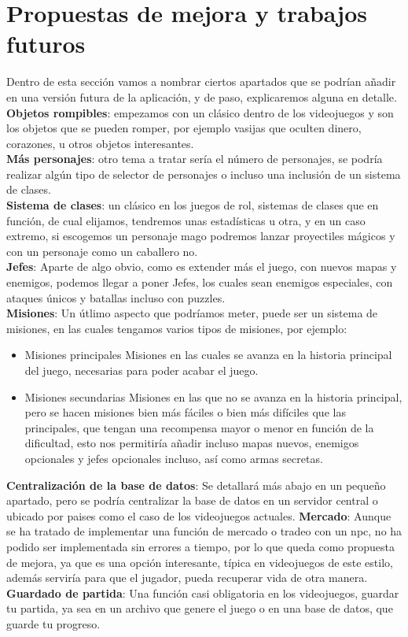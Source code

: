 \documentclass[a4paper]{article}
\begin{document}
\clearpage
\section{Propuestas de mejora y trabajos futuros}
Dentro de esta sección vamos a nombrar ciertos apartados que se podrían añadir en una versión futura de la aplicación, y de paso, explicaremos alguna en detalle.\\
\textbf{Objetos rompibles}: empezamos con un clásico dentro de los videojuegos y son los objetos que se pueden romper, por ejemplo vasijas que oculten dinero, corazones, u otros objetos interesantes.\\
\textbf{Más personajes}: otro tema a tratar sería el número de personajes, se podría realizar algún tipo de selector de personajes o incluso una inclusión de un sistema de clases.\\
\textbf{Sistema de clases}: un clásico en los juegos de rol, sistemas de clases que en función, de cual elijamos, tendremos unas estadísticas u otra, y en un caso extremo, si escogemos un personaje mago podremos lanzar proyectiles mágicos y con un personaje como un caballero no.\\
\textbf{Jefes}: Aparte de algo obvio, como es extender más el juego, con nuevos mapas y enemigos, podemos llegar a poner Jefes, los cuales sean enemigos especiales, con ataques únicos y batallas incluso con puzzles.\\
\textbf{Misiones}: Un útlimo aspecto que podríamos meter, puede ser un sistema de misiones, en las cuales tengamos varios tipos de misiones, por ejemplo:
\begin{itemize}
    \item Misiones principales
          Misiones en las cuales se avanza en la historia principal del juego, necesarias para poder acabar el juego.
    \item Misiones secundarias
          Misiones en las que no se avanza en la historia principal, pero se hacen misiones bien más fáciles o bien más difíciles que las principales, que tengan una recompensa mayor o menor en función de la dificultad, esto nos permitiría añadir incluso mapas nuevos, enemigos opcionales y jefes opcionales incluso, así como armas secretas.
\end{itemize}
\textbf{Centralización de la base de datos}: Se detallará más abajo en un pequeño apartado, pero se podría centralizar la base de datos en un servidor central o ubicado por paises como el caso de los videojuegos actuales.
\textbf{Mercado}: Aunque se ha tratado de implementar una función de mercado o tradeo con un npc, no ha podido ser implementada sin errores a tiempo, por lo que queda como propuesta de mejora, ya que es una opción interesante, típica en videojuegos de este estilo, además serviría para que el jugador, pueda recuperar vida de otra manera.
\textbf{Guardado de partida}: Una función casi obligatoria en los videojuegos, guardar tu partida, ya sea en un archivo que genere el juego o en una base de datos, que guarde tu progreso.
\clearpage
\end{document}
